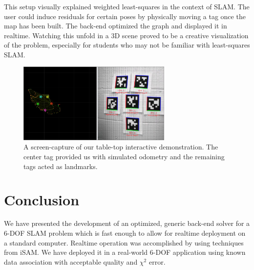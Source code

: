 \documentclass[conference]{IEEEtran}
\begin{document}
This setup visually explained weighted least-squares in the context of \ac{SLAM}.  The
user could induce residuals for certain poses by physically moving a tag once the map has
been built.  The back-end optimized the graph and displayed it in realtime.  Watching this
unfold in a 3D scene proved to be a creative visualization of the problem,
especially for students who may not be familiar with least-squares SLAM.

\begin{figure}[h]
  \centering
  \includegraphics[width=3.0in]{images/interactiveDemo}
  \caption{A screen-capture of our table-top interactive
    demonstration.  The center tag provided us with simulated odometry
  and the remaining tags acted as landmarks.}
  \label{fig:interactiveDemo}
\end{figure}

\section{Conclusion}
\label{sec:conclusion}

We have presented the development of an optimized, generic back-end solver for a 6-\ac{DOF}
\ac{SLAM} problem which is fast enough to allow for realtime deployment on a standard
computer.  Realtime operation was accomplished by using techniques from iSAM. We have 
deployed it in a real-world 6-\ac{DOF} application using known data
association with acceptable quality and $\chi^2$ error.




\end{document}

